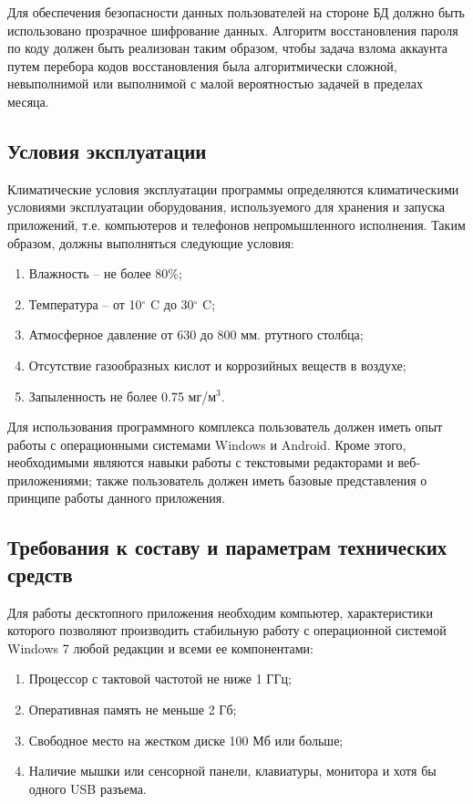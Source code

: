 Для обеспечения безопасности данных пользователей на стороне БД должно быть использовано прозрачное шифрование данных. Алгоритм восстановления пароля по коду должен быть реализован таким образом, чтобы задача взлома аккаунта путем перебора кодов восстановления была алгоритмически сложной, невыполнимой или выполнимой с малой вероятностью задачей в пределах месяца.

\subsection{Условия эксплуатации}
Климатические условия эксплуатации программы определяются климатическими условиями эксплуатации оборудования, используемого для хранения и запуска приложений, т.е. компьютеров и телефонов непромышленного исполнения. Таким образом, должны выполняться следующие условия:

\begin{enumerate}
\item Влажность – не более 80\%;
\item Температура – от 10$^\circ$ C до 30$^\circ$ C;
\item Атмосферное давление от 630 до 800 мм. ртутного столбца;
\item Отсутствие газообразных кислот и коррозийных веществ в воздухе;
\item Запыленность не более 0.75 мг/м$^3$.
\end{enumerate}

Для использования программного комплекса пользователь должен иметь опыт работы с операционными системами Windows и Android. Кроме этого, необходимыми являются навыки работы с текстовыми редакторами и веб-приложениями; также пользователь должен иметь базовые представления о принципе работы данного приложения.

\subsection{Требования к составу и параметрам технических средств}
Для работы десктопного приложения необходим компьютер, характеристики которого позволяют производить стабильную работу с операционной системой Windows 7 любой редакции и всеми ее компонентами:

\begin{enumerate}
\item Процессор с тактовой частотой не ниже 1 ГГц;
\item Оперативная память не меньше 2 Гб;
\item Свободное место на жестком диске 100 Мб или больше;
\item Наличие мышки или сенсорной панели, клавиатуры, монитора и хотя бы одного USB разъема.
\end{enumerate}

